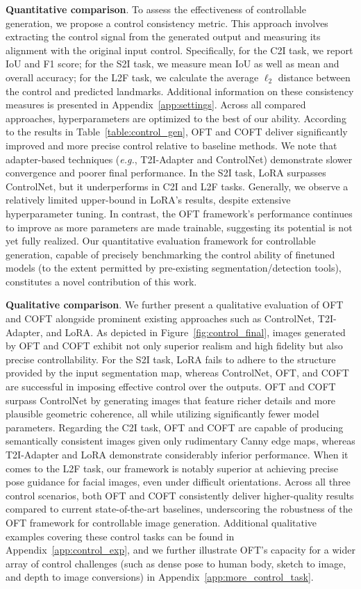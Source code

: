 \textbf{Quantitative comparison}. To assess the effectiveness of controllable generation, we propose a control consistency metric. This approach involves extracting the control signal from the generated output and measuring its alignment with the original input control. Specifically, for the C2I task, we report IoU and F1 score; for the S2I task, we measure mean IoU as well as mean and overall accuracy; for the L2F task, we calculate the average $\ell_2$ distance between the control and predicted landmarks. Additional information on these consistency measures is presented in Appendix~\ref{app:settings}. Across all compared approaches, hyperparameters are optimized to the best of our ability. According to the results in Table~\ref{table:control_gen}, OFT and COFT deliver significantly improved and more precise control relative to baseline methods. We note that adapter-based techniques (\emph{e.g.}, T2I-Adapter and ControlNet) demonstrate slower convergence and poorer final performance. In the S2I task, LoRA surpasses ControlNet, but it underperforms in C2I and L2F tasks. Generally, we observe a relatively limited upper-bound in LoRA's results, despite extensive hyperparameter tuning. In contrast, the OFT framework’s performance continues to improve as more parameters are made trainable, suggesting its potential is not yet fully realized. Our quantitative evaluation framework for controllable generation, capable of precisely benchmarking the control ability of finetuned models (to the extent permitted by pre-existing segmentation/detection tools), constitutes a novel contribution of this work.

\textbf{Qualitative comparison}. We further present a qualitative evaluation of OFT and COFT alongside prominent existing approaches such as ControlNet, T2I-Adapter, and LoRA. As depicted in Figure~\ref{fig:control_final}, images generated by OFT and COFT exhibit not only superior realism and high fidelity but also precise controllability. For the S2I task, LoRA fails to adhere to the structure provided by the input segmentation map, whereas ControlNet, OFT, and COFT are successful in imposing effective control over the outputs. OFT and COFT surpass ControlNet by generating images that feature richer details and more plausible geometric coherence, all while utilizing significantly fewer model parameters. Regarding the C2I task, OFT and COFT are capable of producing semantically consistent images given only rudimentary Canny edge maps, whereas T2I-Adapter and LoRA demonstrate considerably inferior performance. When it comes to the L2F task, our framework is notably superior at achieving precise pose guidance for facial images, even under difficult orientations. Across all three control scenarios, both OFT and COFT consistently deliver higher-quality results compared to current state-of-the-art baselines, underscoring the robustness of the OFT framework for controllable image generation. Additional qualitative examples covering these control tasks can be found in Appendix~\ref{app:control_exp}, and we further illustrate OFT’s capacity for a wider array of control challenges (such as dense pose to human body, sketch to image, and depth to image conversions) in Appendix~\ref{app:more_control_task}.

